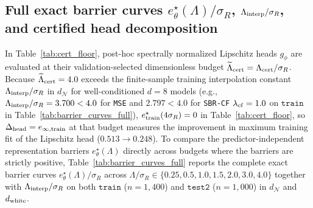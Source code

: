 \documentclass[preprint,11pt,a4paper]{elsarticle}
\begin{document}
\subsection{Full exact barrier curves $e^\star_\theta(\Lambda)/\sigma_R$, $\Lambda_{\rm interp}/\sigma_R$, and certified head decomposition}
\label{sec:barrier_curves}

In Table~\ref{tab:cert_floor}, post-hoc spectrally normalized Lipschitz heads $g_\phi$ are evaluated at their validation-selected dimensionless budget $\widetilde\Lambda_{\rm cert}=\Lambda_{\rm cert}/\sigma_R$. Because $\widetilde\Lambda_{\rm cert}=4.0$ exceeds the finite-sample training interpolation constant $\Lambda_{\rm interp}/\sigma_R$ in $d_{\mathcal N}$ for well-conditioned $d=8$ models (e.g., $\Lambda_{\rm interp}/\sigma_R=3.700<4.0$ for \texttt{MSE} and $2.797<4.0$ for \texttt{SBR-CF} $\lambda_{\rm cf}=1.0$ on $\texttt{train}$ in Table~\ref{tab:barrier_curves_full}), $e^\star_{\rm train}(4\sigma_R)=0$ in Table~\ref{tab:cert_floor}, so $\Delta_{\rm head}=e_{\infty,{\rm train}}$ at that budget measures the improvement in maximum training fit of the Lipschitz head ($0.513\to 0.248$). To compare the predictor-independent representation barriers $e^\star_\theta(\Lambda)$ directly across budgets where the barriers are strictly positive, Table~\ref{tab:barrier_curves_full} reports the complete exact barrier curves $e^\star_\theta(\Lambda)/\sigma_R$ across $\Lambda/\sigma_R\in\{0.25,0.5,1.0,1.5,2.0,3.0,4.0\}$ together with $\Lambda_{\rm interp}/\sigma_R$ on both $\texttt{train}$ ($n=1{,}400$) and $\texttt{test2}$ ($n=1{,}000$) in $d_{\mathcal N}$ and $d_{\rm white}$.
\end{document}
